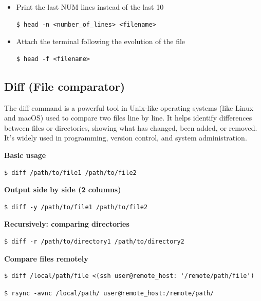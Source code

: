\documentclass{article}
\newenvironment{codetemplate}[1][]{%
  \mybasecolorbox[#1]
  \itshape
}{%
  \endmybasecolorbox
}
\begin{document}
\begin{itemize}
    \item Print the last NUM lines instead of the last 10
\begin{codetemplate}{}
\begin{verbatim}
$ head -n <number_of_lines> <filename>
\end{verbatim}
\end{codetemplate}

    \item Attach the terminal following the evolution of the file
\begin{codetemplate}{}
\begin{verbatim}
$ head -f <filename>
\end{verbatim}
\end{codetemplate}
\end{itemize}

\subsection{Diff (File comparator)}
The diff command is a powerful tool in Unix-like operating systems (like Linux and macOS) used to compare two files line by line. It helps identify differences between files or directories, showing what has changed, been added, or removed. It's widely used in programming, version control, and system administration.

\textbf{Basic usage}
\begin{codetemplate}{}
\begin{verbatim}
$ diff /path/to/file1 /path/to/file2
\end{verbatim}
\end{codetemplate}

\textbf{Output side by side (2 columns)}
\begin{codetemplate}{}
\begin{verbatim}
$ diff -y /path/to/file1 /path/to/file2
\end{verbatim}
\end{codetemplate}

\textbf{Recursively: comparing directories}
\begin{codetemplate}{}
\begin{verbatim}
$ diff -r /path/to/directory1 /path/to/directory2
\end{verbatim}
\end{codetemplate}

\textbf{Compare files remotely}
\begin{codetemplate}{}
\begin{verbatim}
$ diff /local/path/file <(ssh user@remote_host: '/remote/path/file')
\end{verbatim}
\end{codetemplate}
\begin{codetemplate}{}
\begin{verbatim}
$ rsync -avnc /local/path/ user@remote_host:/remote/path/
\end{verbatim}
\end{codetemplate}
\end{document}
